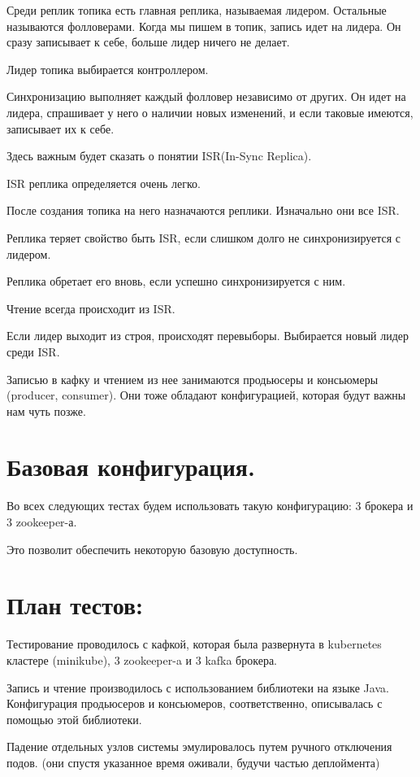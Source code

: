 \documentclass[11pt]{article}
\begin{document}
    Среди реплик топика есть главная реплика, называемая лидером. Остальные называются фолловерами. Когда мы пишем в
    топик, запись идет на лидера. Он сразу записывает к себе, больше лидер ничего не делает.

    Лидер топика выбирается контроллером.

    Синхронизацию выполняет каждый фолловер независимо от других. Он идет на лидера, спрашивает у него о наличии
    новых изменений, и если таковые имеются, записывает их к себе.

    Здесь важным будет сказать о понятии ISR(In-Sync Replica).

    ISR реплика определяется очень легко.

    После создания топика на него назначаются реплики. Изначально они все ISR.

    Реплика теряет свойство быть ISR, если слишком долго не синхронизируется с лидером.

    Реплика обретает его вновь, если успешно синхронизируется с ним.

    Чтение всегда происходит из ISR.

    Если лидер выходит из строя, происходят перевыборы. Выбирается новый лидер среди ISR.

    Записью в кафку и чтением из нее занимаются продьюсеры и консьюмеры (producer, consumer). Они тоже обладают
    конфигурацией, которая будут важны нам чуть позже.

    \section{Базовая конфигурация.}
    Во всех следующих тестах будем использовать такую конфигурацию: 3 брокера и 3 zookeeper-а.

    Это позволит обеспечить некоторую базовую доступность.
    \section{План тестов:}
    Тестирование проводилось с кафкой, которая была развернута в kubernetes кластере (minikube), 3 zookeeper-a и 3
    kafka
    брокера.

    Запись и чтение производилось с использованием библиотеки на языке Java. Конфигурация продьюсеров и консьюмеров,
    соответственно, описывалась с помощью этой библиотеки.

    Падение отдельных узлов системы эмулировалось путем ручного отключения подов. (они спустя указанное время оживали,
    будучи частью деплоймента)
\end{document}
